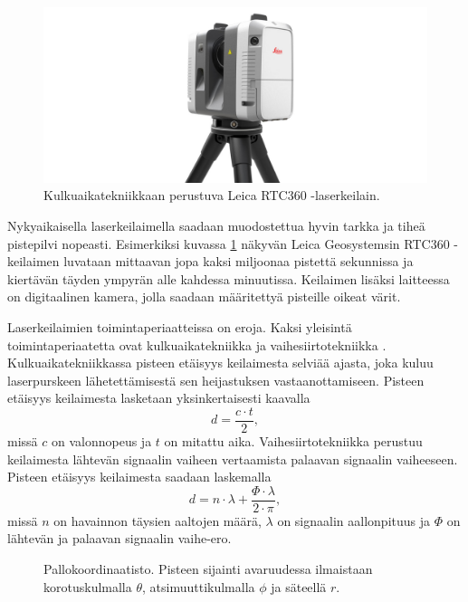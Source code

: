 \begin{figure}
    \centering
    \includegraphics[width=0.7\paperwidth]{img/leica.jpg}
    \caption{Kulkuaikatekniikkaan perustuva Leica RTC360 -laserkeilain. \cite{skannerikuva}}
    \label{leica}
\end{figure}

Nykyaikaisella laserkeilaimella saadaan muodostettua hyvin tarkka ja tiheä pistepilvi nopeasti. Esimerkiksi kuvassa \ref{leica} näkyvän Leica Geosystemsin RTC360 -keilaimen luvataan mittaavan jopa kaksi miljoonaa pistettä sekunnissa ja kiertävän täyden ympyrän alle kahdessa minuutissa. Keilaimen lisäksi laitteessa on digitaalinen kamera, jolla saadaan määritettyä pisteille oikeat värit. \cite{leica} 

Laserkeilaimien toimintaperiaatteissa on eroja. Kaksi yleisintä toimintaperiaatetta ovat kulkuaikatekniikka  ja vaihesiirtotekniikka . Kulkuaikatekniikkassa pisteen etäisyys keilaimesta selviää ajasta, joka kuluu laserpurskeen lähetettämisestä sen heijastuksen vastaanottamiseen. Pisteen etäisyys keilaimesta lasketaan yksinkertaisesti kaavalla 
\begin{equation}
    d=\frac{c\cdot t}{2},    
\end{equation}
missä $c$ on valonnopeus ja $t$ on mitattu aika. 
Vaihesiirtotekniikka perustuu keilaimesta lähtevän signaalin vaiheen vertaamista palaavan signaalin vaiheeseen. Pisteen etäisyys keilaimesta saadaan laskemalla 
\begin{equation}
    d=n\cdot \lambda + \frac{\Phi \cdot \lambda}{2 \cdot \pi},
\end{equation}
missä $n$ on havainnon täysien aaltojen määrä, $\lambda$ on signaalin aallonpituus ja $\Phi$ on lähtevän ja palaavan signaalin vaihe-ero. \cite{fabritius}

\begin{figure}
    \centering
    
    \caption{Pallokoordinaatisto. Pisteen sijainti avaruudessa ilmaistaan korotuskulmalla $\theta$, atsimuuttikulmalla $\phi$ ja säteellä $r$.}
    \label{pallo}
\end{figure}{}

